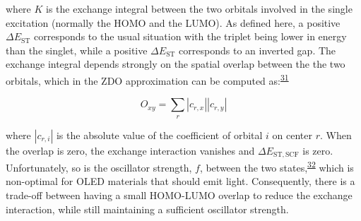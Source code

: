 \documentclass[
  number,
  3p]{elsarticle}
\newcommand{\DeltaE}[2][]{\Delta E^{\mathrm{#1}}_{\mathrm{#2}}}
\newcommand{\DeltaEST}[2][]{\Delta E^{\mathrm{#1}}_{\mathrm{ST,#2}}}
\begin{document}
where \(K\) is the exchange integral between the two orbitals involved
in the single excitation (normally the HOMO and the LUMO). As defined
here, a positive \(\DeltaE{ST}\) corresponds to the usual situation with
the triplet being lower in energy than the singlet, while a positive
\(\DeltaE{ST}\) corresponds to an inverted gap. The exchange integral
depends strongly on the spatial overlap between the the two orbitals,
which in the ZDO approximation can be computed
as:\textsuperscript{\protect\hyperlink{ref-peachExcitationEnergiesDensity2008}{31}}

\[
O_{xy} = \sum_{r} |c_{r,x}||c_{r,y}|
\]

where \(|c_{r,i}|\) is the absolute value of the coefficient of orbital
\(i\) on center \(r\). When the overlap is zero, the exchange
interaction vanishes and \(\DeltaEST{SCF}\) is zero. Unfortunately, so
is the oscillator strength, \(f\), between the two
states,\textsuperscript{\protect\hyperlink{ref-klessingerExcitedStatesPhotochemistry1995}{32}}
which is non-optimal for OLED materials that should emit light.
Consequently, there is a trade-off between having a small HOMO-LUMO
overlap to reduce the exchange interaction, while still maintaining a
sufficient oscillator strength.
\end{document}

